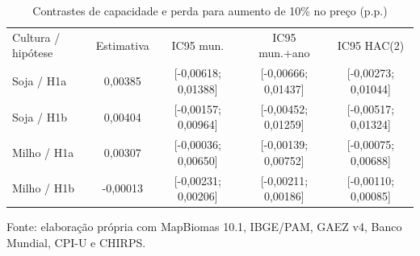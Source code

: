 \begin{table}[htbp]
\centering
\footnotesize
\setlength{\tabcolsep}{3pt}
\renewcommand{\arraystretch}{1.1}
\normalcaption\captionstyle{\centering}
\caption{Contrastes de capacidade e perda para aumento de 10\% no preço (p.p.)}
\label{tab:h1-magnitudes}
\begin{tabular}{lcccc}
\hline
Cultura / hipótese & Estimativa & IC95 mun. & IC95 mun.+ano & IC95 HAC(2) \\
Soja / H1a & 0,00385 & [-0,00618; 0,01388] & [-0,00666; 0,01437] & [-0,00273; 0,01044] \\
Soja / H1b & 0,00404 & [-0,00157; 0,00964] & [-0,00452; 0,01259] & [-0,00517; 0,01324] \\
Milho / H1a & 0,00307 & [-0,00036; 0,00650] & [-0,00139; 0,00752] & [-0,00075; 0,00688] \\
Milho / H1b & -0,00013 & [-0,00231; 0,00206] & [-0,00211; 0,00186] & [-0,00110; 0,00085] \\
\hline\end{tabular}
\par\smallskip
\begin{minipage}{\textwidth}\footnotesize\centering
Fonte: elaboração própria com MapBiomas 10.1, IBGE/PAM, GAEZ v4, Banco Mundial, CPI-U e CHIRPS.
\end{minipage}
\end{table}
